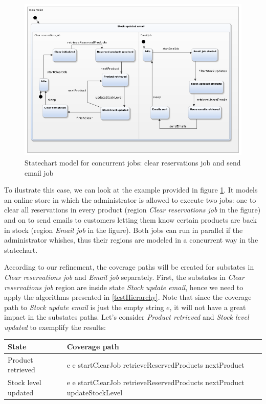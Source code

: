 \begin{figure}[htb]
\centering
\includegraphics[width=15cm]{figuras/stockUpdateEmail}
\caption{\label{fig:stockUpdateEmail} Statechart model for concurrent jobs: clear reservations job and send email job}
\end{figure}

To ilustrate this case, we can look at the example provided in figure \ref{fig:stockUpdateEmail}. It models an online store in which the administrator is allowed to execute two jobs: one to clear all reservations in every product (region \textit{Clear reservations job} in the figure) and on to send emails to customers letting them know certain products are back in stock (region \textit{Email job} in the figure). Both jobs can run in parallel if the administrator whishes, thus their regions are modeled in a concurrent way in the statechart. 

According to our refinement, the coverage paths will be created for substates in \textit{Clear reservations job} and \textit{Email job} separately. First, the substates in \textit{Clear reservations job} region are inside state \textit{Stock update email}, hence we need to apply the algorithms presented in \ref{testHierarchy}. Note that since the coverage path to \textit{Stock update email} is just the empty string $e$, it will not have a great impact in the substates paths. Let's consider \textit{Product retrieved} and \textit{Stock level updated} to exemplify the results:

\begin{center}
\begin{tabular}{| p{4cm} | p{10cm}|}

\hline

State & Coverage path \\ \hline

Product retrieved & e e startClearJob retrieveReservedProducts nextProduct \\ \hline

Stock level updated & e e startClearJob retrieveReservedProducts nextProduct updateStockLevel \\

\hline
\end{tabular}
\end{center}

